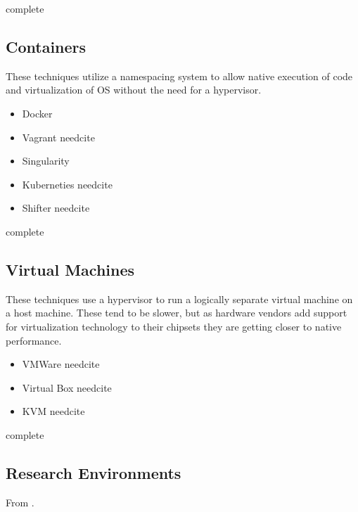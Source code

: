\documentclass[american]{article}
\newcommand{\complete}{
	\gls{complete}
}
\newcommand{\needcite}{
	\gls{needcite}
}
\begin{document}
\complete

\subsection{Containers} \label{sec:software-containers}

These techniques utilize a namespacing system to allow native execution of code and virtualization of OS without the need for a hypervisor.

\begin{itemize}
\item Docker \cite{Docker}
\item Vagrant \needcite
\item Singularity \cite{Singularity}
\item Kuberneties \needcite
\item Shifter \needcite
\end{itemize}

\complete

\subsection{Virtual Machines} \label{sec:software-virtual}

These techniques use a hypervisor to run a logically separate virtual machine on a host machine. These tend to be slower, but as hardware vendors add support for virtualization technology to their chipsets they are getting closer to native performance.

\begin{itemize}
\item VMWare \needcite
\item Virtual Box \needcite
\item KVM \needcite
\end{itemize}

\complete

\subsection{Research Environments} \label{sec:software-environments}

From \cite{stodden-sharing-reproducibility-talk-2017}.
\end{document}
